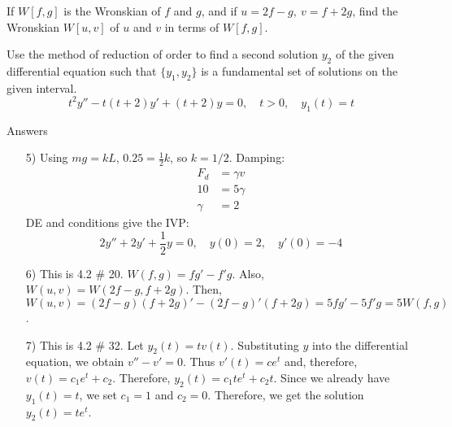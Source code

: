 \documentclass[12pt]{exam}
\begin{document}
\begin{questions}
    \vspace{4cm} 
    
    \question[3] If $W[f, g]$ is the Wronskian of $f$ and $g$, and if $u=2f - g, \ v=f +2g$, find the Wronskian $W[u,v]$ of $u$ and $v$ in terms of $W [ f , g]$.

    \vspace{6cm} 
    
    \newpage
    
    \question[7] Use the method of reduction of order to find a second solution $y_2$ of the given differential equation such that $\{y_1, y_2\}$ is a fundamental set of solutions on the given interval. $$t^2y'' - t(t+2)y' + (t+2)y=0, \quad t > 0 , \quad y_1(t) = t$$
    
        
\end{questions}



\newpage

\large{Answers}

\begin{enumerate}

\item[5)] Using $mg = kL$, $0.25 = \frac 12 k$, so $k = 1/2$. Damping: \begin{align*}F_d &= \gamma v \\ 10&=5 \gamma  \\
\gamma &= 2\end{align*}
DE and conditions give the IVP: 
$$2y'' +2y' + \frac 12 y = 0, \quad y(0) = 2, \quad y'(0) = -4$$ 
\item[6)] This is 4.2 \# 20. $W(f,g) = fg' - f'g$. Also, $W(u,v) = W(2f - g,f + 2g) $. Then, $W(u,v) =(2f-g)(f+2g)'
 - (2f- g)'(f+2g)= 5fg' - 5f'g = 5W(f,g)$. 

\item[7)] This is 4.2 \# 32. Let $y_2(t) = tv(t)$. Substituting $y$ into the differential equation, we obtain $v'' - v' = 0$. Thus $v'(t) = ce^t$ and, therefore, $v(t) = c_1 e^t + c_2$. Therefore, $y_2(t) = c_1te^t + c_2t$. Since we already have $y_1(t) = t$, we set $c_1 = 1$ and $c_2 = 0$. Therefore, we get the solution $y_2(t) = te^t$.
\end{enumerate} 
\end{document}
